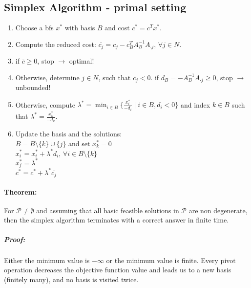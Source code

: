 \documentclass[main]{subfiles}
\begin{document}
\subsection{Simplex Algorithm - primal setting}
\begin{enumerate}
\item Choose a bfs $x^*$ with basis $B$ and cost $c^* = c^T x^*$.
\item Compute the reduced cost: $\bar{c_j} = c_j - c^T_B A^{-1}_B A_{\cdot j}$,
$\forall j \in N$.
\item if $\bar{c} \geq 0$, stop $\rightarrow$ optimal!
\item Otherwise, determine $j \in N$, such that $\bar{c_j} < 0$.
\subitem if $d_B = - A^{-1}_B A_{\cdot j} \geq 0$, stop $\rightarrow$ unbounded!
\item Otherwise, compute $\lambda^* = \min_{i \in B} \{\frac{x^*_i}{-d_i}
\mid i \in B, d_i < 0 \}$ and index $k \in B$ such that $\lambda^* =
\frac{x^*_k}{-d_k}$.
\item Update the basis and the solutions:\\
$B = B\setminus \{k\} \cup \{j\}$ and set $x^*_k = 0$\\
$x^*_i = x^*_i + \lambda^* d_i$, $\forall i \in B\setminus \{k\}$\\
$x^*_j = \lambda^*$\\
$c^* = c^* + \lambda^* \bar{c_j}$
\end{enumerate}

\paragraph{Theorem:} For $\mathcal{P} \neq \emptyset$ and assuming that all
basic feasible solutions in $\mathcal{P}$ are non degenerate, then the simplex
algorithm terminates with a correct answer in finite time.
\subparagraph{Proof:}
Either the minimum value is $-\infty$ or the minimum value is finite.
Every pivot operation decreases the objective function value and leads us to a
new basis (finitely many), and no basis is visited twice.
\end{document}
